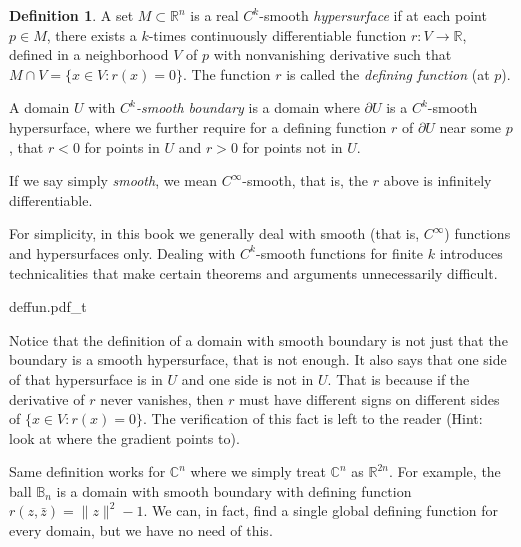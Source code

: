 \documentclass[12pt,openany]{book}
\newcommand{\snorm}[1]{\lVert {#1} \rVert}
\newcommand{\C}{{\mathbb{C}}}
\newcommand{\R}{{\mathbb{R}}}
\newcommand{\bB}{{\mathbb{B}}}
\newcommand{\myindex}[1]{#1\index{#1}}
\theoremstyle{plain}
\theoremstyle{remark}
\theoremstyle{definition}
\newtheorem{defn}[thm]{Definition}
\theoremstyle{exercise}
\theoremstyle{example}
\begin{document}
\begin{defn} \label{def:hypersurface}
A set $M \subset \R^n$ is a real
$C^k$-smooth \emph{\myindex{hypersurface}}%
if at each point
$p \in M$, there exists a $k$-times continuously
differentiable function $r \colon V \to
\R$, defined in a neighborhood $V$ of $p$ with nonvanishing derivative
such that $M \cap V = \bigl\{ x \in V : r(x) = 0 \bigr\}$.  The function $r$ is
called the \emph{\myindex{defining function}} (at $p$).

A domain $U$ with
\emph{$C^k$-smooth boundary}%
%
is a domain where
$\partial U$ is a $C^k$-smooth hypersurface, where we further require
for a defining function $r$ of $\partial U$ near some $p$,
that $r < 0$ for points in $U$ and $r > 0$
for points not in $U$.

If we say simply
\emph{smooth},
we mean $C^\infty$-smooth,
that is, the $r$ above is infinitely differentiable.
\end{defn}

For simplicity, in this book we generally deal with smooth
(that is, $C^\infty$) functions and hypersurfaces only.  Dealing with
$C^k$-smooth functions for finite $k$ introduces technicalities that make
certain theorems and arguments unnecessarily difficult.


\begin{center}
{deffun.pdf_t}
\end{center}


Notice that the definition of a domain with smooth boundary is not just that the
boundary is a smooth hypersurface, that is not enough.  It also says that 
one side of that hypersurface is in $U$ and one side is not in $U$.  That is
because if the derivative of $r$ never vanishes, then $r$ must have
different signs on different sides of $\{ x \in V : r(x) = 0 \}$.  The
verification of this fact is left to the reader (Hint: look at where the
gradient points to).

Same definition works for $\C^n$ where we simply treat $\C^n$ as $\R^{2n}$.
For example, the ball $\bB_n$ is a domain with smooth boundary with defining
function $r(z,\bar{z}) = \snorm{z}^2-1$.  We can, in fact, find a
single global defining function for every domain, but we have no need of this.
\end{document}
